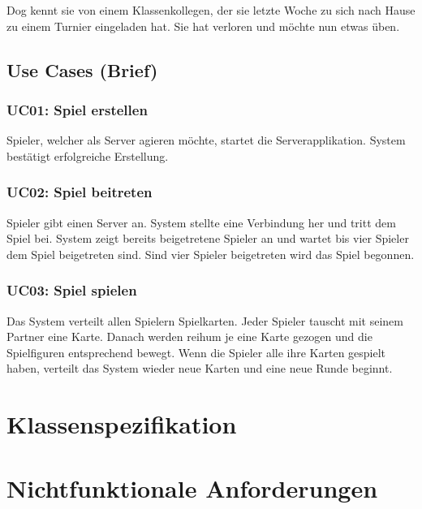 \documentclass[a4paper,12pt,halfparskip,DIV14]{scrartcl}
\begin{document}
Dog kennt sie von einem Klassenkollegen, der sie letzte Woche zu sich nach Hause zu einem Turnier eingeladen hat. Sie hat verloren und möchte nun etwas üben.

\subsection{Use Cases (Brief)}\label{sec:use_cases_brief_} %
\subsubsection{UC01: Spiel erstellen}\label{sub:uc01_spiel_erstellen} %
Spieler, welcher als Server agieren möchte, startet die Serverapplikation. System bestätigt erfolgreiche Erstellung.

\subsubsection{UC02: Spiel beitreten}\label{sub:uc02_spiel_beitreten} %
Spieler gibt einen Server an. System stellte eine Verbindung her und tritt dem Spiel bei. System zeigt bereits beigetretene Spieler an und wartet bis vier Spieler dem Spiel beigetreten sind. Sind vier Spieler beigetreten wird das Spiel begonnen.

\subsubsection{UC03: Spiel spielen}\label{sub:uc03_spiel_spielen} %
Das System verteilt allen Spielern Spielkarten. Jeder Spieler tauscht mit seinem Partner eine Karte. Danach werden reihum je eine Karte gezogen und die Spielfiguren entsprechend bewegt. Wenn die Spieler alle ihre Karten gespielt haben, verteilt das System wieder neue Karten und eine neue Runde beginnt. 

\section{Klassenspezifikation}\label{cha:klassenspezifikation} %


\section{Nichtfunktionale Anforderungen}\label{cha:nichtfunktionale_anforderungen} %
\end{document}
